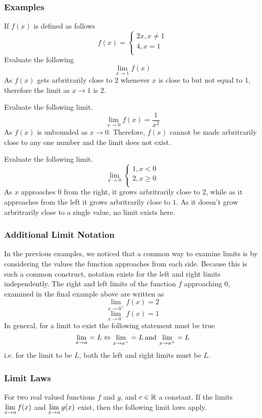 \documentclass[12pt]{report}
\begin{document}
\begin{flushleft}
\subsubsection*{Examples}
If \(f(x)\) is defined as follows 
\[
    f(x) =
    \begin{cases}
        2x, x \neq 1 \\
        4, x = 1 \\
    \end{cases}
\]
Evaluate the following
\[\lim_{x\rightarrow 1} f(x)\]
As \(f(x)\) gets arbritrarily close to \(2\) whenever \(x\) is close to but not
equal to \(1\), therefore the limit as \(x\rightarrow1\) is \(2\).

\bigskip\bigskip
Evaluate the following limit.
\[\lim_{x\rightarrow0}f(x) = \frac{1}{x^2}\]
As \(f(x)\) is unbounded as \(x\rightarrow0\). Therefore, \(f(x)\) cannot be 
made arbritrarily close to any one number and the limit does not exist.

\bigskip\bigskip
Evaluate the following limit.
\[
    \lim_{x\rightarrow0}
    \begin{cases}
        1, x < 0 \\
        2, x \geq 0 \\
    \end{cases}
\]
As \(x\) approaches \(0\) from the right, it grows arbritrarily close to \(2\),
while as it approaches from the left it grows arbritrarily close to \(1\). As 
it doesn't grow arbritrarily close to a single value, no limit exists here.

\subsubsection*{Additional Limit Notation}
In the previous examples, we noticed that a common way to examine limits is by
considering the values the function approaches from each side. Because this is
such a common construct, notation exists for the left and right limits
independently. The right and left limits of the function \(f\) approaching 
\(0\), examined in the final example above are written as
\[\lim_{x\rightarrow0^+}f(x) = 2\]
\[\lim_{x\rightarrow0^-}f(x) = 1\]
In general, for a limit to exist the following statement must be true
\[\lim_{x\rightarrow a} = L \Leftrightarrow \lim_{x\rightarrow a^-} = L
\:\mathrm{and}\: \lim_{x\rightarrow a^+} = L\]
i.e. for the limit to be \(L\), both the left and right limits must be \(L\).

\subsubsection*{Limit Laws}
For two real valued functions \(f\) and \(g\), and \(c \in \mathbb{R}\) a constant. If
the limits \(\lim\limits_{x\rightarrow a} f(x)\) and 
\(\lim\limits_{x\rightarrow a} g(x)\) exist, then the following limit laws 
apply.


\end{flushleft}
\end{document}
